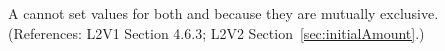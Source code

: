 A \Species cannot set values for both  and
 because they are mutually exclusive.  (References:
L2V1 Section 4.6.3; L2V2 Section~\ref{sec:initialAmount}.)
